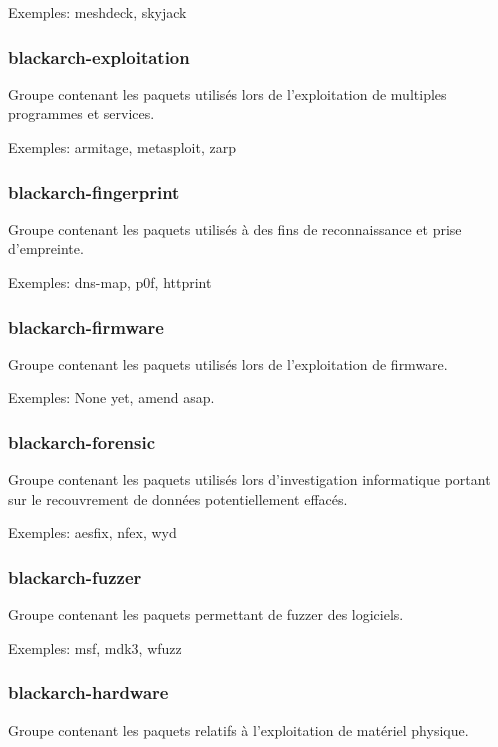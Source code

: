 \documentclass[a4paper, oneside, 11pt]{book}
\begin{document}
Exemples: meshdeck, skyjack

\subsubsection{blackarch-exploitation}

Groupe contenant les paquets utilis\'{e}s lors de l'exploitation de multiples
programmes et services.

Exemples: armitage, metasploit, zarp

\subsubsection{blackarch-fingerprint}

Groupe contenant les paquets utilis\'{e}s \`{a} des fins de reconnaissance et prise d'empreinte.

Exemples: dns-map, p0f, httprint

\subsubsection{blackarch-firmware}

Groupe contenant les paquets utilis\'{e}s lors de l'exploitation de firmware.

Exemples: None yet, amend asap.

\subsubsection{blackarch-forensic}

Groupe contenant les paquets utilis\'{e}s lors d'investigation informatique portant sur le recouvrement de donn\'{e}es potentiellement effac\'{e}s.

Exemples: aesfix, nfex, wyd

\subsubsection{blackarch-fuzzer}

Groupe contenant les paquets permettant de fuzzer des logiciels.

Exemples: msf, mdk3, wfuzz

\subsubsection{blackarch-hardware}

Groupe contenant les paquets relatifs \`{a} l'exploitation de mat\'{e}riel physique.
\end{document}
